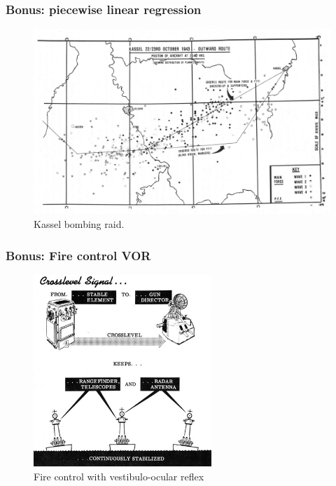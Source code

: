 \documentclass{beamer}
\begin{document}
\begin{frame}
\frametitle{Bonus: piecewise linear regression}
\begin{figure}[t]
    \includegraphics[width=\textwidth]{figure/Kassel_piecewise_linear.jpg}
    \centering
    \caption{Kassel bombing raid.}
\end{figure}
\end{frame}

\begin{frame}
    \frametitle{Bonus: Fire control VOR}
    
    \begin{figure}[t]
        \includegraphics[width=0.6\textwidth]{figure/fire_control_VOR.png}
        \centering
        \caption{Fire control with vestibulo-ocular reflex}
    \end{figure}
\end{frame}
    
\end{document}
